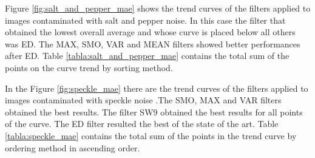 Figure \ref{fig:salt_and_pepper_mae} shows the trend curves of the filters applied to images contaminated with salt and pepper noise. In this case the filter that obtained the lowest overall average and whose curve is placed below all others was ED. The MAX, SMO, VAR and MEAN filters showed better performances after ED. Table \ref{tabla:salt_and_pepper_mae} contains the total sum of the points on the curve trend by sorting method.

In the Figure \ref{fig:speckle_mae} there are the trend curves of the filters applied to images contaminated with speckle noise .The SMO, MAX and VAR filters obtained the best results. The filter SW9 obtained the best results for all points of the curve. The ED filter resulted the best of the state of the art. Table \ref{tabla:speckle_mae} contains the total sum of the points in the trend curve by ordering method in ascending order.

%
%

